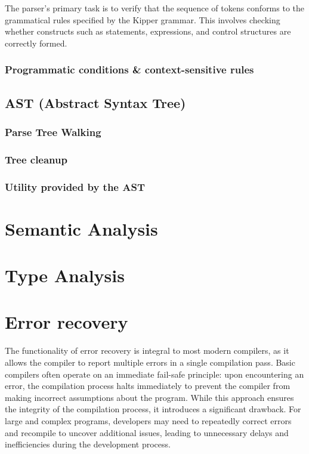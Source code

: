 The parser's primary task is to verify that the sequence of tokens conforms to the grammatical rules specified by the Kipper grammar. This involves checking whether constructs such as statements, expressions, and control structures are correctly formed.

\subsubsection{Programmatic conditions \& context-sensitive rules}

\subsection{AST (Abstract Syntax Tree)}
\label{sec:translation-to-the-ast}

\subsubsection{Parse Tree Walking}

\subsubsection{Tree cleanup}

\subsubsection{Utility provided by the AST}

\section{Semantic Analysis}
\label{sec:semantic-analysis}

\section{Type Analysis}
\label{sec:type-analysis}

\section{Error recovery}

The functionality of error recovery is integral to most modern compilers, as it allows the compiler to report multiple errors in a single compilation pass. Basic compilers often operate on an immediate fail-safe principle: upon encountering an error, the compilation process halts immediately to prevent the compiler from making incorrect assumptions about the program. While this approach ensures the integrity of the compilation process, it introduces a significant drawback. For large and complex programs, developers may need to repeatedly correct errors and recompile to uncover additional issues, leading to unnecessary delays and inefficiencies during the development process.

